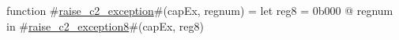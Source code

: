 function #\hyperref[sailMIPSzraisezyc2zyexception]{raise\_c2\_exception}#(capEx, regnum) =
  let reg8 = 0b000 @ regnum in
  #\hyperref[sailMIPSzraisezyc2zyexception8]{raise\_c2\_exception8}#(capEx, reg8)
